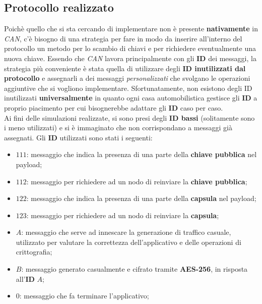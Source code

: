 \subsection{Protocollo realizzato}
Poichè quello che si sta cercando di implementare non è presente \textbf{nativamente} in \emph{CAN}, c'è bisogno di una strategia per fare in modo da inserire all'interno del protocollo un metodo per lo scambio di chiavi e per richiedere eventualmente una nuova chiave. Essendo che \emph{CAN} lavora principalmente con gli \textbf{ID} dei messaggi, la strategia più conveniente è stata quella di utilizzare degli \textbf{ID inutilizzati dal protocollo} e assegnarli a dei messaggi \emph{personalizzati} che svolgano le operazioni aggiuntive che si vogliono implementare. Sfortunatamente, non esistono degli ID inutilizzati \textbf{universalmente} in quanto ogni casa automobilistica gestisce gli \textbf{ID} a proprio piacimento per cui bisognerebbe adattare gli \textbf{ID} caso per caso.\\
Ai fini delle simulazioni realizzate, si sono presi degli \textbf{ID bassi} (solitamente sono i meno utilizzati) e si è immaginato che non corrispondano a messaggi già assegnati. Gli \textbf{ID} utilizzati sono stati i seguenti:
\begin{itemize}
    \item $111$: messaggio che indica la presenza di una parte della \textbf{chiave pubblica} nel payload;
    \item $112$: messaggio per richiedere ad un nodo di reinviare la \textbf{chiave pubblica};
    \item $122$: messaggio che indica la presenza di una parte della \textbf{capsula} nel payload;
    \item $123$: messaggio per richiedere ad un nodo di reinviare la \textbf{capsula};
    \item $A$: messaggio che serve ad innescare la generazione di traffico casuale, utilizzato per valutare la correttezza dell'applicativo e delle operazioni di crittografia;
    \item $B$: messaggio generato casualmente e cifrato tramite \textbf{AES-256}, in risposta all'\textbf{ID} $A$;
    \item $0$: messaggio che fa terminare l'applicativo;
\end{itemize}

